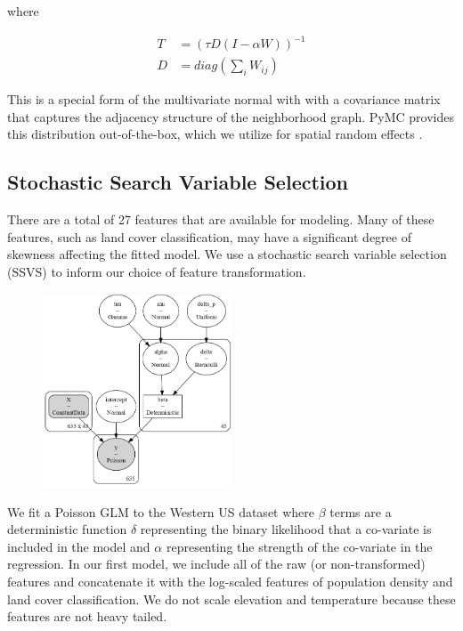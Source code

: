 \documentclass[notitlepage]{article}
\begin{document}
where

\begin{equation}
\begin{aligned}
    T &= (\tau D (I-\alpha W))^{-1} \\
    D &= diag(\sum_{i} W_{ij})
\end{aligned}
\end{equation}


This is a special form of the multivariate normal with with a covariance matrix that captures the adjacency structure of the neighborhood graph. 
PyMC provides this distribution out-of-the-box, which we utilize for spatial random effects \cite{salvatier_probabilistic_2016}.

\subsection{Stochastic Search Variable Selection}

There are a total of 27 features that are available for modeling.
Many of these features, such as land cover classification, may have a significant degree of skewness affecting the fitted model.
We use a stochastic search variable selection (SSVS) to inform our choice of feature transformation.

\begin{figure}[H]
\centering
\includegraphics[width=0.5\textwidth]{report/figures/svss_model.png}
\end{figure}

We fit a Poisson GLM to the Western US dataset where $\beta$ terms are a deterministic function $\delta$ representing the binary likelihood that a co-variate is included in the model and $\alpha$ representing the strength of the co-variate in the regression.
In our first model, we include all of the raw (or non-transformed) features and concatenate it with the log-scaled features of population density and land cover classification.
We do not scale elevation and temperature because these features are not heavy tailed.
\end{document}
